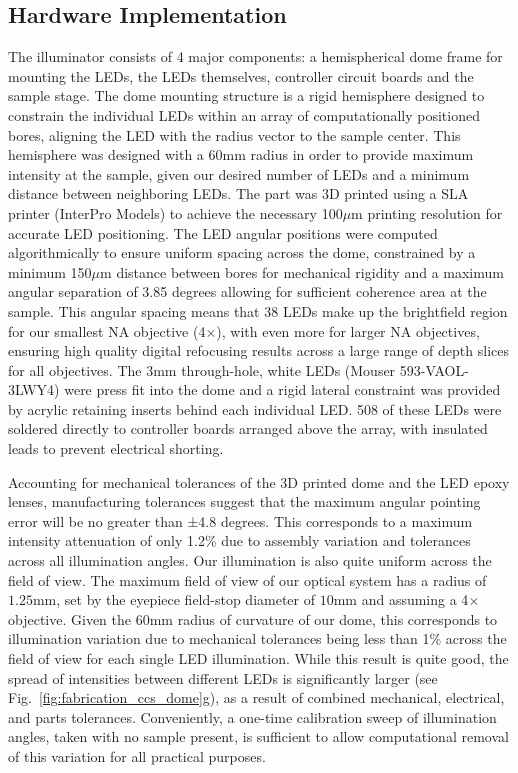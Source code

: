 \subsection{Hardware Implementation}
The illuminator consists of 4 major components: a hemispherical dome frame for mounting the LEDs, the LEDs themselves, controller circuit boards and the sample stage. The dome mounting structure is a rigid hemisphere designed to constrain the individual LEDs within an array of computationally positioned bores, aligning the LED with the radius vector to the sample center.  This hemisphere was designed with a $60\textrm{mm}$ radius in order to provide maximum intensity at the sample, given our desired number of LEDs and a minimum distance between neighboring LEDs. The part was 3D printed using a SLA printer (InterPro Models) to achieve the necessary 100$\mu$m printing resolution for accurate LED positioning. The LED angular positions were computed algorithmically to ensure uniform spacing across the dome, constrained by a minimum 150$\mu$m distance between bores for mechanical rigidity and a maximum angular separation of 3.85 degrees allowing for sufficient coherence area at the sample. This angular spacing means that 38 LEDs make up the brightfield region for our smallest NA objective (4$\times$), with even more for larger NA objectives, ensuring high quality digital refocusing results across a large range of depth slices for all objectives. The $3\textrm{mm}$ through-hole, white LEDs (Mouser 593-VAOL-3LWY4) were press fit into the dome and a rigid lateral constraint was provided by acrylic retaining inserts behind each individual LED. 508 of these LEDs were soldered directly to controller boards arranged above the array, with insulated leads to prevent electrical shorting.

Accounting for mechanical tolerances of the 3D printed dome and the LED epoxy lenses, manufacturing tolerances suggest that the maximum angular pointing error will be no greater than ±4.8 degrees. This corresponds to a maximum intensity attenuation of only 1.2\% due to assembly variation and tolerances across all illumination angles. Our illumination is also quite uniform across the field of view. The maximum field of view of our optical system has a radius of $1.25\textrm{mm}$, set by the eyepiece field-stop diameter of $10\textrm{mm}$ and assuming a 4$\times$ objective. Given the $60\textrm{mm}$ radius of curvature of our dome, this corresponds to illumination variation due to mechanical tolerances being less than 1\% across the field of view for each single LED illumination.  While this result is quite good, the spread of intensities between different LEDs is significantly larger (see Fig.~\ref{fig:fabrication_ccs_dome}g), as a result of combined mechanical, electrical, and parts tolerances. Conveniently, a one-time calibration sweep of illumination angles, taken with no sample present, is sufficient to allow computational removal of this variation for all practical purposes.


